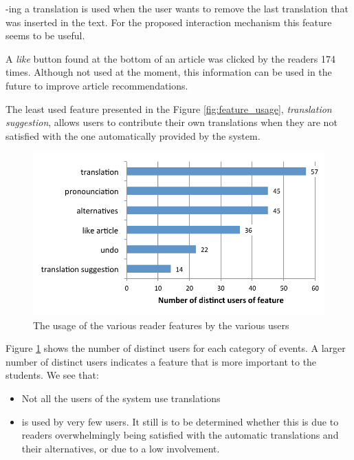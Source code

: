 -ing a translation is used when the user wants to remove the last translation that was inserted in the text. For the proposed interaction mechanism this feature seems to be useful. 

A {\em like} button found at the bottom of an article  was clicked by the readers 174 times. Although not used at the moment, this information can be used in the future to improve article recommendations.

The least used feature presented in the Figure \ref{fig:feature_usage}, {\em translation suggestion}, allows users to contribute their own translations when they are not satisfied with the one automatically provided by the system. 

  \begin{figure}[h!]
  \centering
    \includegraphics[width=0.9\columnwidth]{figures/reader_feature_usage_per_user}
    \caption{The usage of the various reader features by the various users }
    \label{fig:usage_per_user}
  \end{figure}


Figure \ref{fig:usage_per_user} shows the number of distinct users for each category of events. A larger number of distinct users indicates a feature that is more important to the students. We see that: 
\begin{itemize}
  \item Not all the users of the system use translations
  \item {} is used by very few users. It still is to be determined whether this is due to readers overwhelmingly being satisfied with the automatic translations and their alternatives, or due to a low involvement. 
\end{itemize}



